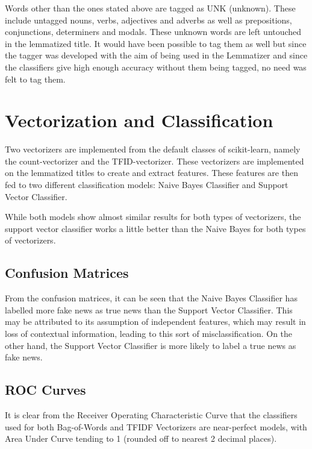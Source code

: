 \documentclass{article}
\begin{document}
Words other than the ones stated above are tagged as UNK (unknown). These include untagged nouns, verbs, adjectives and adverbs as well as prepositions, conjunctions, determiners and modals. These unknown words are left untouched in the lemmatized title. It would have been possible to tag them as well but since the tagger was developed with the aim of being used in the Lemmatizer and since the classifiers give high enough accuracy without them being tagged, no need was felt to tag them.

\section{Vectorization and Classification}
Two vectorizers are implemented from the default classes of scikit-learn, namely the count-vectorizer and the TFID-vectorizer. These vectorizers are implemented on the lemmatized titles to create and extract features. These features are then fed to two different classification models: Naive Bayes Classifier and Support Vector Classifier. 

While both models show almost similar results for both types of vectorizers, the support vector classifier works a little better than the Naive Bayes for both types of vectorizers. 

\subsection{Confusion Matrices}

From the confusion matrices, it can be seen that the Naive Bayes Classifier has labelled more fake news as true news than the Support Vector Classifier. This may be attributed to its assumption of independent features, which may result in loss of contextual information, leading to this sort of misclassification. On the other hand, the Support Vector Classifier is more likely to label a true news as fake news. 

\subsection{ROC Curves}
It is clear from the Receiver Operating Characteristic Curve that the classifiers used for both Bag-of-Words and TFIDF Vectorizers are near-perfect models, with Area Under Curve tending to 1 (rounded off to nearest 2 decimal places).
\end{document}
